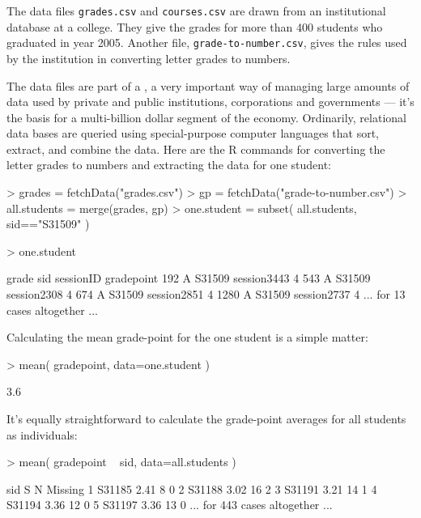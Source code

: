 The data files \texttt{grades.csv} and \texttt{courses.csv} are drawn from
an institutional database at a college.  They give the grades for more
than 400 students who graduated in year 2005.  Another file,
\texttt{grade-to-number.csv}, gives the rules used by the institution
in converting letter grades to numbers.  

The data files are part of a , a very
important way of managing large amounts of data used by private and
public institutions, corporations and governments --- it's the basis
for a multi-billion dollar segment of the economy.  Ordinarily,
relational data bases are queried using special-purpose computer
languages that sort, extract, and combine the data.  Here are the R
commands for converting the letter grades to numbers and extracting
the data for one student:
\begin{Schunk}
\begin{Sinput}
> grades = fetchData("grades.csv")
> gp = fetchData("grade-to-number.csv")
> all.students = merge(grades, gp)
> one.student = subset( all.students, sid=="S31509" )
\end{Sinput}
\end{Schunk}
\begin{Schunk}
\begin{Sinput}
> one.student
\end{Sinput}
\end{Schunk}
\begin{Schunk}
\begin{Soutput}
     grade    sid   sessionID gradepoint
192      A S31509 session3443          4
543      A S31509 session2308          4
674      A S31509 session2851          4
1280     A S31509 session2737          4
... for 13 cases altogether ...
\end{Soutput}
\end{Schunk}

Calculating the mean grade-point for the one student is a simple matter:
\begin{Schunk}
\begin{Sinput}
> mean( gradepoint, data=one.student )
\end{Sinput}
\begin{Soutput}
[1] 3.6
\end{Soutput}
\end{Schunk}

It's equally straightforward to calculate the grade-point averages
for all students as individuals:
\begin{Schunk}
\begin{Sinput}
> mean( gradepoint ~ sid, data=all.students )
\end{Sinput}
\end{Schunk}
\begin{Schunk}
\begin{Soutput}
     sid    S  N Missing
1 S31185 2.41  8       0
2 S31188 3.02 16       2
3 S31191 3.21 14       1
4 S31194 3.36 12       0
5 S31197 3.36 13       0
... for 443 cases altogether ...
\end{Soutput}
\end{Schunk}

